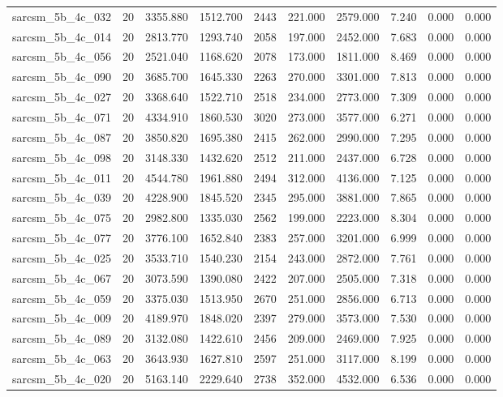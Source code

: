 \begin{tabular}{lrrrrrrrrr}
sarcsm\_5b\_4c\_032 & 20 & 3355.880 & 1512.700 & 2443 & 221.000 & 2579.000 & 7.240 & 0.000 & 0.000 \\
sarcsm\_5b\_4c\_014 & 20 & 2813.770 & 1293.740 & 2058 & 197.000 & 2452.000 & 7.683 & 0.000 & 0.000 \\
sarcsm\_5b\_4c\_056 & 20 & 2521.040 & 1168.620 & 2078 & 173.000 & 1811.000 & 8.469 & 0.000 & 0.000 \\
sarcsm\_5b\_4c\_090 & 20 & 3685.700 & 1645.330 & 2263 & 270.000 & 3301.000 & 7.813 & 0.000 & 0.000 \\
sarcsm\_5b\_4c\_027 & 20 & 3368.640 & 1522.710 & 2518 & 234.000 & 2773.000 & 7.309 & 0.000 & 0.000 \\
sarcsm\_5b\_4c\_071 & 20 & 4334.910 & 1860.530 & 3020 & 273.000 & 3577.000 & 6.271 & 0.000 & 0.000 \\
sarcsm\_5b\_4c\_087 & 20 & 3850.820 & 1695.380 & 2415 & 262.000 & 2990.000 & 7.295 & 0.000 & 0.000 \\
sarcsm\_5b\_4c\_098 & 20 & 3148.330 & 1432.620 & 2512 & 211.000 & 2437.000 & 6.728 & 0.000 & 0.000 \\
sarcsm\_5b\_4c\_011 & 20 & 4544.780 & 1961.880 & 2494 & 312.000 & 4136.000 & 7.125 & 0.000 & 0.000 \\
sarcsm\_5b\_4c\_039 & 20 & 4228.900 & 1845.520 & 2345 & 295.000 & 3881.000 & 7.865 & 0.000 & 0.000 \\
sarcsm\_5b\_4c\_075 & 20 & 2982.800 & 1335.030 & 2562 & 199.000 & 2223.000 & 8.304 & 0.000 & 0.000 \\
sarcsm\_5b\_4c\_077 & 20 & 3776.100 & 1652.840 & 2383 & 257.000 & 3201.000 & 6.999 & 0.000 & 0.000 \\
sarcsm\_5b\_4c\_025 & 20 & 3533.710 & 1540.230 & 2154 & 243.000 & 2872.000 & 7.761 & 0.000 & 0.000 \\
sarcsm\_5b\_4c\_067 & 20 & 3073.590 & 1390.080 & 2422 & 207.000 & 2505.000 & 7.318 & 0.000 & 0.000 \\
sarcsm\_5b\_4c\_059 & 20 & 3375.030 & 1513.950 & 2670 & 251.000 & 2856.000 & 6.713 & 0.000 & 0.000 \\
sarcsm\_5b\_4c\_009 & 20 & 4189.970 & 1848.020 & 2397 & 279.000 & 3573.000 & 7.530 & 0.000 & 0.000 \\
sarcsm\_5b\_4c\_089 & 20 & 3132.080 & 1422.610 & 2456 & 209.000 & 2469.000 & 7.925 & 0.000 & 0.000 \\
sarcsm\_5b\_4c\_063 & 20 & 3643.930 & 1627.810 & 2597 & 251.000 & 3117.000 & 8.199 & 0.000 & 0.000 \\
sarcsm\_5b\_4c\_020 & 20 & 5163.140 & 2229.640 & 2738 & 352.000 & 4532.000 & 6.536 & 0.000 & 0.000 \\

\end{tabular}

